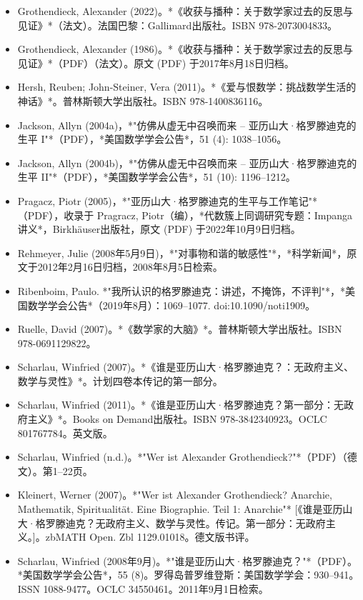 \begin{itemize}
\item Grothendieck, Alexander (2022)。*《收获与播种：关于数学家过去的反思与见证》*（法文）。法国巴黎：Gallimard出版社。ISBN 978-2073004833。  
\item Grothendieck, Alexander (1986)。*《收获与播种：关于数学家过去的反思与见证》*（PDF）（法文）。原文 (PDF) 于2017年8月18日归档。  
\item Hersh, Reuben; John-Steiner, Vera (2011)。*《爱与恨数学：挑战数学生活的神话》*。普林斯顿大学出版社。ISBN 978-1400836116。  
\item Jackson, Allyn (2004a)，*"仿佛从虚无中召唤而来 – 亚历山大·格罗滕迪克的生平 I"*（PDF），*美国数学学会公告*，51 (4): 1038–1056。  
\item Jackson, Allyn (2004b)，*"仿佛从虚无中召唤而来 – 亚历山大·格罗滕迪克的生平 II"*（PDF），*美国数学学会公告*，51 (10): 1196–1212。
\item Pragacz, Piotr (2005)，*"亚历山大·格罗滕迪克的生平与工作笔记"*（PDF），收录于 Pragracz, Piotr（编），*代数簇上同调研究专题：Impanga 讲义*，Birkhäuser出版社，原文 (PDF) 于2022年10月9日归档。  
\item Rehmeyer, Julie (2008年5月9日)，*"对事物和谐的敏感性"*，*科学新闻*，原文于2012年2月16日归档，2008年8月5日检索。  
\item Ribenboim, Paulo. *"我所认识的格罗滕迪克：讲述，不掩饰，不评判"*，*美国数学学会公告*（2019年8月）：1069–1077. doi:10.1090/noti1909。  
\item Ruelle, David (2007)。*《数学家的大脑》*。普林斯顿大学出版社。ISBN 978-0691129822。
\item Scharlau, Winfried (2007)。*《谁是亚历山大·格罗滕迪克？：无政府主义、数学与灵性》*。计划四卷本传记的第一部分。  
\item Scharlau, Winfried (2011)。*《谁是亚历山大·格罗滕迪克？第一部分：无政府主义》*。Books on Demand出版社。ISBN 978-3842340923。OCLC 801767784。英文版。  
\item Scharlau, Winfried (n.d.)。*"Wer ist Alexander Grothendieck?"*（PDF）（德文）。第1–22页。  
\item Kleinert, Werner (2007)。*"Wer ist Alexander Grothendieck? Anarchie, Mathematik, Spiritualität. Eine Biographie. Teil 1: Anarchie"* [《谁是亚历山大·格罗滕迪克？无政府主义、数学与灵性。传记。第一部分：无政府主义。]。zbMATH Open. Zbl 1129.01018。德文版书评。
\item Scharlau, Winfried (2008年9月)。*"谁是亚历山大·格罗滕迪克？"*（PDF）。*美国数学学会公告*，55 (8)。罗得岛普罗维登斯：美国数学学会：930–941。ISSN 1088-9477。OCLC 34550461。2011年9月1日检索。  

\end{itemize}
